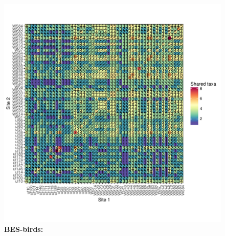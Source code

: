 \documentclass[11pt, oneside]{article}
\begin{document}
\begin{figure}[h!]
\includegraphics[scale = 0.4]{bes-birds-nilon_spp_shared.pdf}
\caption{{\bf BES-birds:} }
\label{bes-birds}
\end{figure}



\renewcommand{\refname}{\subsection*{References}}

\end{document}
